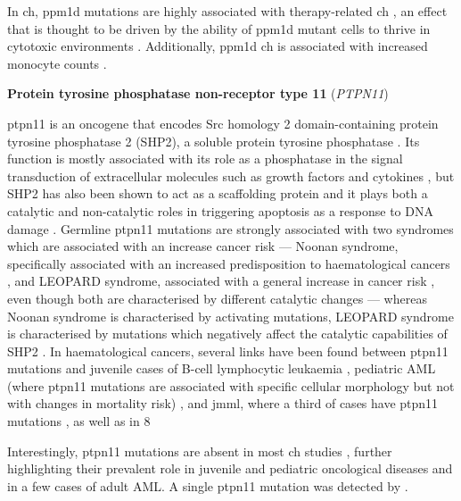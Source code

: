 In \ac{ch}, \ac{ppm1d} mutations are highly associated with therapy-related \ac{ch} \cite{Hsu2018-cc,Zajkowicz2015-nw,Bolton2020-ct,Zehir2017-gh}, an effect that is thought to be driven by the ability of \ac{ppm1d} mutant cells to thrive in cytotoxic environments \cite{Hsu2018-ta}. Additionally, \ac{ppm1d} \ac{ch} is associated with increased monocyte counts \cite{Dawoud2020-af}.

\noindent \textbf{Protein tyrosine phosphatase non-receptor type 11} (\textit{PTPN11})

\Ac{ptpn11} is an oncogene that encodes Src homology 2 domain-containing protein tyrosine phosphatase 2 (SHP2), a soluble protein tyrosine phosphatase \cite{Chan2007-xf}. Its function is mostly associated with its role as a phosphatase in the signal transduction of extracellular molecules such as growth factors and cytokines \cite{Chan2008-zh}, but SHP2 has also been shown to act as a scaffolding protein \cite{Bennett1994-wa,Li1994-xn} and it plays both a catalytic and non-catalytic roles in triggering apoptosis as a response to DNA damage \cite{Yuan2005-xt}. Germline \ac{ptpn11} mutations are strongly associated with two syndromes which are associated with an increase cancer risk --- Noonan syndrome, specifically associated with an increased predisposition to haematological cancers \cite{Tartaglia2001-ru},  and LEOPARD syndrome, associated with a general increase in cancer risk \cite{Digilio2002-nq}, even though both are characterised by different catalytic changes --- whereas Noonan syndrome is characterised by activating mutations, LEOPARD syndrome is characterised by mutations which negatively affect the catalytic capabilities of SHP2 \cite{Kontaridis2006-ia}. In haematological cancers, several links have been found between \ac{ptpn11} mutations and juvenile cases of B-cell lymphocytic leukaemia \cite{Tartaglia2004-lc}, pediatric AML (where \ac{ptpn11} mutations are associated with specific cellular morphology but not with changes in mortality risk) \cite{Loh2004-fg}, and \ac{jmml}, where a third of cases have \ac{ptpn11} mutations \cite{Tartaglia2003-xw,Kratz2005-qh}, as well as in 8%

Interestingly, \ac{ptpn11} mutations are absent in most \ac{ch} studies \cite{Zehir2017-gh,Genovese2014-eu,Xie2014-np,Jaiswal2014-rl,Bolton2020-ct,Zink2017-zi,McKerrell2015-rl}, further highlighting their prevalent role in juvenile and pediatric oncological diseases and in a few cases of adult AML. A single \ac{ptpn11} mutation was detected by  \cite{Acuna-Hidalgo2017-ng}.

